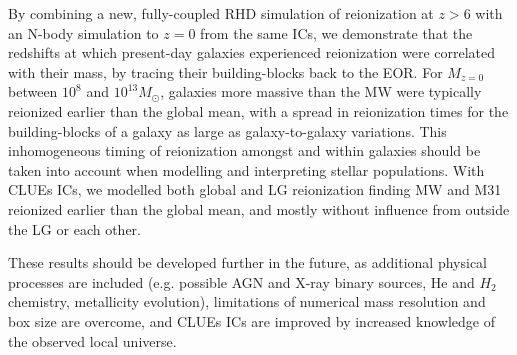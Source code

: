 \documentclass[twocolumn]{aastex61}
\begin{document}
By combining a new, fully-coupled RHD simulation of reionization at $z > 6$ with an N-body simulation to $z = 0$ from the same ICs, we demonstrate that the redshifts at which present-day galaxies experienced reionization were correlated with their mass, by tracing their building-blocks back to the EOR. For $M_{z=0}$ between $10^{8}$ and $10^{13} M_\odot$, galaxies more massive than the MW were typically reionized earlier than the global mean, with a spread in reionization times for the building-blocks of a galaxy as large as galaxy-to-galaxy variations. This inhomogeneous timing of reionization amongst and within galaxies should be taken into account when modelling and interpreting stellar populations.  With CLUEs ICs, we modelled both global and LG reionization finding MW and M31 reionized earlier than the global mean, and mostly without influence from outside the LG or each other.


These results should be developed further in the future, as additional physical processes are included (e.g. possible AGN and X-ray binary sources, He and $H_2$ chemistry, metallicity evolution), limitations of numerical mass resolution and box size are overcome, and CLUEs ICs are improved by increased knowledge of the observed local universe.  


 
\end{document}
